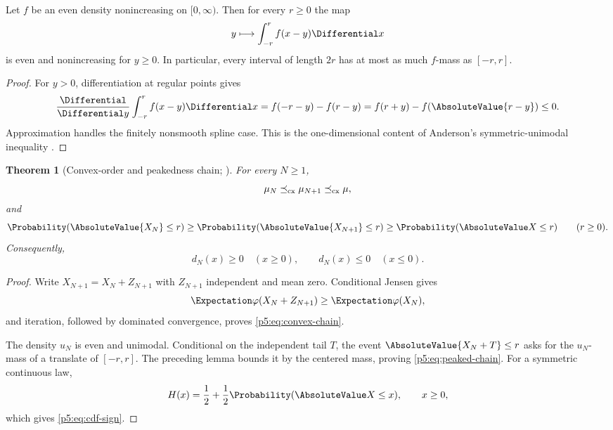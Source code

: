 \documentclass[11pt,oneside]{article}
\numberwithin{equation}{section}
\newtheorem{theorem}{Theorem}[section]
\theoremstyle{definition}
\theoremstyle{remark}
\begin{document}
\begin{lemma}
Let $f$ be an even density nonincreasing on $[0,\infty)$.  Then for every $r\ge0$ the map
\[
 y\longmapsto\int_{-r}^{r}f(x-y)\Differential x
\]
is even and nonincreasing for $y\ge0$.  In particular, every interval of length $2r$ has at most as much $f$-mass as $[-r,r]$.
\end{lemma}

\begin{proof}
For $y>0$, differentiation at regular points gives
\[
 \frac{\Differential}{\Differential y}\int_{-r}^{r}f(x-y)\Differential x
 =f(-r-y)-f(r-y)=f(r+y)-f(\AbsoluteValue{r-y})\le0.
\]
Approximation handles the finitely nonsmooth spline case.  This is the one-dimensional content of Anderson's symmetric-unimodal inequality \cite{p5:Anderson1955}.
\end{proof}

\begin{theorem}[Convex-order and peakedness chain; \newresult]
For every $N\ge1$,
\begin{equation}
 \mu_N\preceq_{\rm cx}\mu_{N+1}\preceq_{\rm cx}\mu,
 \label{p5:eq:convex-chain}
\end{equation}
and
\begin{equation}
 \Probability(\AbsoluteValue{X_N}\le r)
 \ge\Probability(\AbsoluteValue{X_{N+1}}\le r)
 \ge\Probability(\AbsoluteValue X\le r)
 \qquad(r\ge0).
 \label{p5:eq:peaked-chain}
\end{equation}
Consequently,
\begin{equation}
 d_N(x)\ge0\quad(x\ge0),
 \qquad
 d_N(x)\le0\quad(x\le0).
 \label{p5:eq:cdf-sign}
\end{equation}
\end{theorem}

\begin{proof}
Write $X_{N+1}=X_N+Z_{N+1}$ with $Z_{N+1}$ independent and mean zero.  Conditional Jensen gives
\[
 \Expectation\varphi(X_N+Z_{N+1})\ge\Expectation\varphi(X_N),
\]
and iteration, followed by dominated convergence, proves \eqref{p5:eq:convex-chain}.

The density $u_N$ is even and unimodal.  Conditional on the independent tail $T$, the event $\AbsoluteValue{X_N+T}\le r$ asks for the $u_N$-mass of a translate of $[-r,r]$.  The preceding lemma bounds it by the centered mass, proving \eqref{p5:eq:peaked-chain}.  For a symmetric continuous law,
\[
 H(x)=\frac12+\frac12\Probability(\AbsoluteValue X\le x),\qquad x\ge0,
\]
which gives \eqref{p5:eq:cdf-sign}.
\end{proof}
\end{document}
